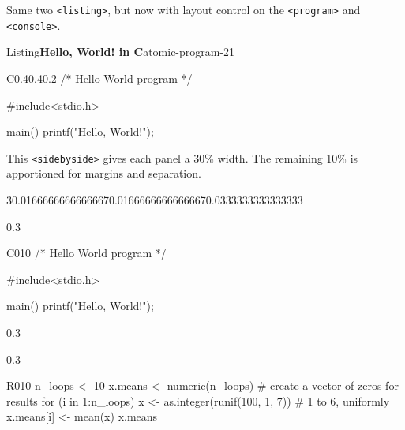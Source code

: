 \documentclass{amsart}
\theoremstyle{plain}%
\theoremstyle{definition}%
\theoremstyle{remark}%
\newcommand{\mono}[1]{\texttt{#1}}
\numberwithin{equation}{section}
\newcommand{\consoleinput}[1]{\textbf{#1}}
\begin{document}
Same two \mono{<listing>}, but now with layout control on the \mono{<program>} and \mono{<console>}.%
\begin{listingptx}{Listing}{\textbf{Hello, World! in C}}{atomic-program-21}{}%
\begin{program}{C}{0.4}{0.4}{0.2}
/* Hello World program */

#include<stdio.h>

main()
{
    printf("Hello, World!");
}
\end{program}
\end{listingptx}%
%
This \mono{<sidebyside>} gives each panel a 30\% width.  The remaining 10\% is apportioned for margins and separation.%
\begin{sidebyside}{3}{0.0166666666666667}{0.0166666666666667}{0.0333333333333333}%
\begin{sbspanel}{0.3}%
\begin{program}{C}{0}{1}{0}
/* Hello World program */

#include<stdio.h>

main()
{
    printf("Hello, World!");
}
\end{program}
\end{sbspanel}%
\begin{sbspanel}{0.3}%
\end{sbspanel}%
\begin{sbspanel}{0.3}%
\begin{program}{R}{0}{1}{0}
n_loops <- 10
x.means <- numeric(n_loops)  # create a vector of zeros for results
for (i in 1:n_loops){
    x <- as.integer(runif(100, 1, 7))  # 1 to 6, uniformly
    x.means[i] <- mean(x)
}
x.means
\end{program}
\end{sbspanel}%
\end{sidebyside}%
\end{document}
